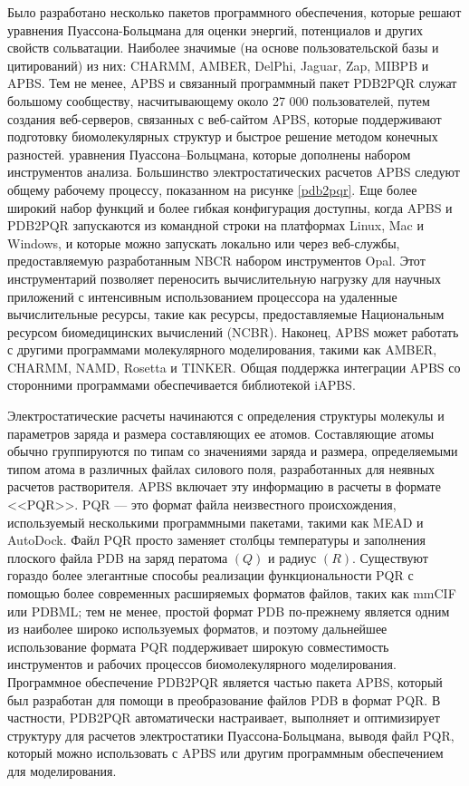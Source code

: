 Было разработано несколько пакетов программного обеспечения, которые решают уравнения Пуассона-Больцмана для оценки энергий, потенциалов и других свойств сольватации. Наиболее значимые (на основе пользовательской базы и цитирований) из них: CHARMM, AMBER, DelPhi, Jaguar, Zap, MIBPB и APBS. Тем не менее, APBS и связанный программный пакет PDB2PQR служат большому сообществу, насчитывающему около 27 000 пользователей, путем создания веб-серверов, связанных с веб-сайтом APBS, которые поддерживают подготовку биомолекулярных структур и быстрое решение методом конечных разностей. уравнения Пуассона–Больцмана, которые дополнены набором инструментов анализа. Большинство электростатических расчетов APBS следуют общему рабочему процессу, показанном на рисунке \ref{pdb2pqr}. Еще более широкий набор функций и более гибкая конфигурация доступны, когда APBS и PDB2PQR запускаются из командной строки на платформах Linux, Mac и Windows, и которые можно запускать локально или через веб-службы, предоставляемую разработанным NBCR набором инструментов Opal. Этот инструментарий позволяет переносить вычислительную нагрузку для научных приложений с интенсивным использованием процессора на удаленные вычислительные ресурсы, такие как ресурсы, предоставляемые Национальным ресурсом биомедицинских вычислений (NCBR). Наконец, APBS может работать с другими программами молекулярного моделирования, такими как AMBER, CHARMM, NAMD, Rosetta и TINKER. Общая поддержка интеграции APBS со сторонними программами обеспечивается библиотекой iAPBS.

Электростатические расчеты начинаются с определения структуры молекулы и параметров заряда и размера составляющих ее атомов. Составляющие атомы обычно группируются по типам со значениями заряда и размера, определяемыми типом атома в различных файлах силового поля, разработанных для неявных расчетов растворителя. APBS включает эту информацию в расчеты в формате <<PQR>>. PQR — это формат файла неизвестного происхождения, используемый несколькими программными пакетами, такими как MEAD и AutoDock. Файл PQR просто заменяет столбцы температуры и заполнения плоского файла PDB на заряд ператома $(Q)$ и радиус $(R)$. Существуют гораздо более элегантные способы реализации функциональности PQR с помощью более современных расширяемых форматов файлов, таких как mmCIF или PDBML; тем не менее, простой формат PDB по-прежнему является одним из наиболее широко используемых форматов, и поэтому дальнейшее использование формата PQR поддерживает широкую совместимость инструментов и рабочих процессов биомолекулярного моделирования. Программное обеспечение PDB2PQR является частью пакета APBS, который был разработан для помощи в преобразование файлов PDB в формат PQR. В частности, PDB2PQR автоматически настраивает, выполняет и оптимизирует структуру для расчетов электростатики Пуассона-Больцмана, выводя файл PQR, который можно использовать с APBS или другим программным обеспечением для моделирования.


